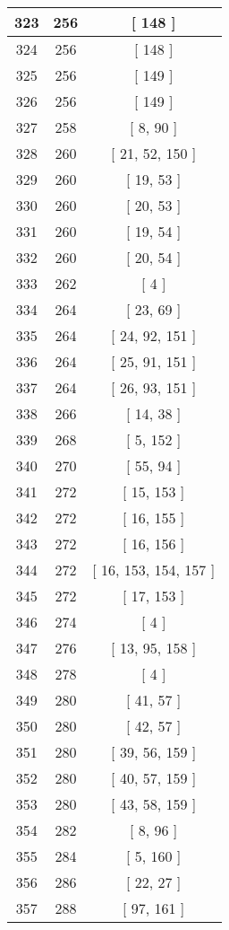 \begin{center}
\begin{longtable}[H]{|| c c c ||}
\hline
323 & 256 & [ 148 ] \\ 
\hline
324 & 256 & [ 148 ] \\ 
\hline
325 & 256 & [ 149 ] \\ 
\hline
326 & 256 & [ 149 ] \\ 
\hline
327 & 258 & [ 8, 90 ] \\ 
\hline
328 & 260 & [ 21, 52, 150 ] \\ 
\hline
329 & 260 & [ 19, 53 ] \\ 
\hline
330 & 260 & [ 20, 53 ] \\ 
\hline
331 & 260 & [ 19, 54 ] \\ 
\hline
332 & 260 & [ 20, 54 ] \\ 
\hline
333 & 262 & [ 4 ] \\ 
\hline
334 & 264 & [ 23, 69 ] \\ 
\hline
335 & 264 & [ 24, 92, 151 ] \\ 
\hline
336 & 264 & [ 25, 91, 151 ] \\ 
\hline
337 & 264 & [ 26, 93, 151 ] \\ 
\hline
338 & 266 & [ 14, 38 ] \\ 
\hline
339 & 268 & [ 5, 152 ] \\ 
\hline
340 & 270 & [ 55, 94 ] \\ 
\hline
341 & 272 & [ 15, 153 ] \\ 
\hline
342 & 272 & [ 16, 155 ] \\ 
\hline
343 & 272 & [ 16, 156 ] \\ 
\hline
344 & 272 & [ 16, 153, 154, 157 ] \\ 
\hline
345 & 272 & [ 17, 153 ] \\ 
\hline
346 & 274 & [ 4 ] \\ 
\hline
347 & 276 & [ 13, 95, 158 ] \\ 
\hline
348 & 278 & [ 4 ] \\ 
\hline
349 & 280 & [ 41, 57 ] \\ 
\hline
350 & 280 & [ 42, 57 ] \\ 
\hline
351 & 280 & [ 39, 56, 159 ] \\ 
\hline
352 & 280 & [ 40, 57, 159 ] \\ 
\hline
353 & 280 & [ 43, 58, 159 ] \\ 
\hline
354 & 282 & [ 8, 96 ] \\ 
\hline
355 & 284 & [ 5, 160 ] \\ 
\hline
356 & 286 & [ 22, 27 ] \\ 
\hline
357 & 288 & [ 97, 161 ] \\ 

\end{longtable}
\end{center}
